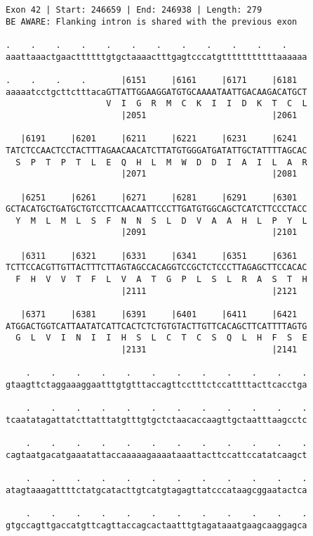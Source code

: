 \documentclass{article}
\begin{document}
\begin{Verbatim}
Exon 42 | Start: 246659 | End: 246938 | Length: 279
BE AWARE: Flanking intron is shared with the previous exon
 
.    .    .    .    .    .    .    .    .    .    .    .    
aaattaaactgaacttttttgtgctaaaactttgagtcccatgtttttttttttaaaaaa
  
.    .    .    .       |6151     |6161     |6171     |6181  
aaaaatcctgcttctttacaGTTATTGGAAGGATGTGCAAAATAATTGACAAGACATGCT
                    V  I  G  R  M  C  K  I  I  D  K  T  C  L
                       |2051                         |2061  
  
   |6191     |6201     |6211     |6221     |6231     |6241  
TATCTCCAACTCCTACTTTAGAACAACATCTTATGTGGGATGATATTGCTATTTTAGCAC
  S  P  T  P  T  L  E  Q  H  L  M  W  D  D  I  A  I  L  A  R
                       |2071                         |2081  
  
   |6251     |6261     |6271     |6281     |6291     |6301  
GCTACATGCTGATGCTGTCCTTCAACAATTCCCTTGATGTGGCAGCTCATCTTCCCTACC
  Y  M  L  M  L  S  F  N  N  S  L  D  V  A  A  H  L  P  Y  L
                       |2091                         |2101  
  
   |6311     |6321     |6331     |6341     |6351     |6361  
TCTTCCACGTTGTTACTTTCTTAGTAGCCACAGGTCCGCTCTCCCTTAGAGCTTCCACAC
  F  H  V  V  T  F  L  V  A  T  G  P  L  S  L  R  A  S  T  H
                       |2111                         |2121  
  
   |6371     |6381     |6391     |6401     |6411     |6421  
ATGGACTGGTCATTAATATCATTCACTCTCTGTGTACTTGTTCACAGCTTCATTTTAGTG
  G  L  V  I  N  I  I  H  S  L  C  T  C  S  Q  L  H  F  S  E
                       |2131                         |2141  
  
    .    .    .    .    .    .    .    .    .    .    .    .
gtaagttctaggaaaggaatttgtgtttaccagttcctttctccattttacttcacctga
  
    .    .    .    .    .    .    .    .    .    .    .    .
tcaatatagattatcttatttatgtttgtgctctaacaccaagttgctaatttaagcctc
  
    .    .    .    .    .    .    .    .    .    .    .    .
cagtaatgacatgaaatattaccaaaaagaaaataaattacttccattccatatcaagct
  
    .    .    .    .    .    .    .    .    .    .    .    .
atagtaaagattttctatgcatacttgtcatgtagagttatcccataagcggaatactca
  
    .    .    .    .    .    .    .    .    .    .    .    .
gtgccagttgaccatgttcagttaccagcactaatttgtagataaatgaagcaaggagca
\end{Verbatim}
\end{document}
